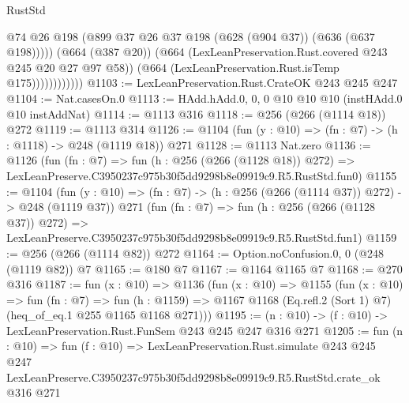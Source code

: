 \begin{lexlean}{RustStd}
\begin{coremodule}
                            @74
                            @26
                            @198
                            (@899 @37 @26 @37 @198 (@628 (@904 @37)) (@636 (@637 @198)))))
                        (@664 (@387 @20))
                        (@664 (LexLeanPreservation.Rust.covered @243 @245 @20 @27 @97 @58))
                        (@664 (LexLeanPreservation.Rust.isTemp @175))))))))))))
@1103 := LexLeanPreservation.Rust.CrateOK @243 @245 @247
@1104 := Nat.casesOn.{0}
@1113 := HAdd.hAdd.{0, 0, 0} @10 @10 @10 (instHAdd.{0} @10 instAddNat)
@1114 := @1113 @316
@1118 := @256 (@266 (@1114 @18)) @272
@1119 := @1113 @314
@1126 := @1104 (fun (y : @10) => (fn : @7) -> (h : @1118) -> @248 (@1119 @18)) @271
@1128 := @1113 Nat.zero
@1136 := @1126
    (fun (fn : @7) =>
    fun (h : @256 (@266 (@1128 @18)) @272) =>
    LexLeanPreserve.C3950237c975b30f5dd9298b8e09919c9.R5.RustStd.fun0)
@1155 := @1104
    (fun (y : @10) => (fn : @7) -> (h : @256 (@266 (@1114 @37)) @272) -> @248 (@1119 @37))
    @271
    (fun (fn : @7) =>
    fun (h : @256 (@266 (@1128 @37)) @272) =>
    LexLeanPreserve.C3950237c975b30f5dd9298b8e09919c9.R5.RustStd.fun1)
@1159 := @256 (@266 (@1114 @82)) @272
@1164 := Option.noConfusion.{0, 0} (@248 (@1119 @82)) @7
@1165 := @180 @7
@1167 := @1164 @1165 @7
@1168 := @270 @316
@1187 := fun (x : @10) =>
  @1136
    (fun (x : @10) =>
    @1155
      (fun (x : @10) =>
      fun (fn : @7) =>
      fun (h : @1159) =>
      @1167 @1168 (Eq.refl.{2} (Sort 1) @7) (heq_of_eq.{1} @255 @1165 @1168 @271)))
@1195 := (n : @10) -> (f : @10) -> LexLeanPreservation.Rust.FunSem @243 @245 @247 @316 @271
@1205 := fun (n : @10) =>
  fun (f : @10) =>
  LexLeanPreservation.Rust.simulate
    @243
    @245
    @247
    LexLeanPreserve.C3950237c975b30f5dd9298b8e09919c9.R5.RustStd.crate_ok
    @316
    @271
\end{coremodule}
\end{lexlean}
